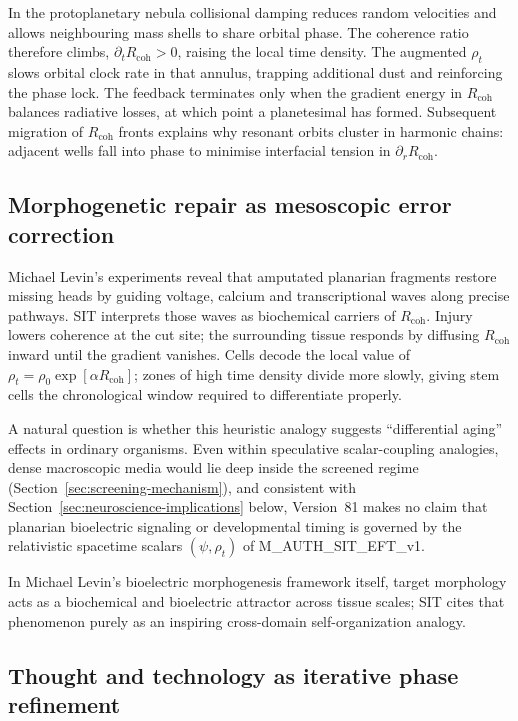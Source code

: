 \documentclass[american,11pt,letterpaper]{article}
\def\texttt#1{#1}%
\def\emph#1{#1}%
\begin{document}
In the protoplanetary nebula collisional damping reduces random velocities and allows neighbouring mass shells to share orbital phase.  The coherence ratio therefore climbs, $\partial_{t}R_{\text{coh}}>0$, raising the local time density.  The augmented $\rho_{t}$ slows orbital clock rate in that annulus, trapping additional dust and reinforcing the phase lock.  The feedback terminates only when the gradient energy in $R_{\text{coh}}$ balances radiative losses, at which point a planetesimal has formed.  Subsequent migration of $R_{\text{coh}}$ fronts explains why resonant orbits cluster in harmonic chains: adjacent wells fall into phase to minimise interfacial tension in $\partial_{r}R_{\text{coh}}$.

\subsection*{Morphogenetic repair as mesoscopic error correction}

Michael Levin's experiments reveal that amputated planarian fragments restore missing heads by guiding voltage, calcium and transcriptional waves along precise pathways.  SIT interprets those waves as biochemical carriers of $R_{\text{coh}}$.  Injury lowers coherence at the cut site; the surrounding tissue responds by diffusing $R_{\text{coh}}$ inward until the gradient vanishes.  Cells decode the local value of $\rho_{t}=\rho_{0}\exp[\alpha R_{\text{coh}}]$; zones of high time density divide more slowly, giving stem cells the chronological window required to differentiate properly.  

A natural question is whether this heuristic analogy suggests ``differential aging'' effects in ordinary organisms. Even within speculative scalar-coupling analogies, dense macroscopic media would lie deep inside the screened regime (Section~\ref{sec:screening-mechanism}), and consistent with Section~\ref{sec:neuroscience-implications} below, Version~81 makes \emph{no} claim that planarian bioelectric signaling or developmental timing is governed by the relativistic spacetime scalars $(\psi, \rho_t)$ of \texttt{M\_AUTH\_SIT\_EFT\_v1}.

In Michael Levin's bioelectric morphogenesis framework itself, target morphology acts as a biochemical and bioelectric attractor across tissue scales; SIT cites that phenomenon purely as an inspiring cross-domain self-organization analogy.

\subsection*{Thought and technology as iterative phase refinement}
\end{document}
